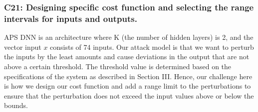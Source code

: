 \subsubsection*{\textbf{C21}: Designing \attack specific cost function and selecting the range intervals for inputs and outputs. }
APS DNN is an architecture where K (the number of hidden layers) is 2, and the vector input $x$ consists of 74 inputs. Our attack model is that we want to perturb the inputs by the least amounts and cause deviations in the output that are not above a certain threshold. The threshold value is determined based on the specifications of the system as described in Section III. 
 Hence, our challenge here is how we design our cost function and add a range limit to the perturbations to ensure that the perturbation does not exceed the input values above or below the bounds. 

